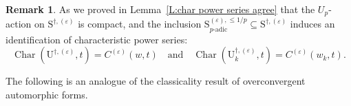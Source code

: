 \documentclass[12pt]{amsart}
\theoremstyle{definition}
\newtheorem{remark}[subsection]{Remark}
\numberwithin{equation}{subsection}
\def\rmU{\mathrm{U}}
\def\rmS{\mathrm{S}}
\DeclareMathOperator{\Char}{Char}
\begin{document}
\begin{remark}
\label{R:comparison of char power series for power basis and small basis}
As we proved in Lemma~\ref{L:char power series agree} that the $U_p$-action on $\rmS^{\dagger, (\varepsilon)}$ is compact, and the inclusion $\rmS_{p\textrm{-adic}}^{(\varepsilon), \leq 1/p} \subseteq \rmS^{\dagger, (\varepsilon)}$ induces an identification of  characteristic power series: 
\begin{equation}
\label{E:char Up of power is equal to char Up of small basis}\Char(\rmU^{\dagger,(\varepsilon)},t) = C^{(\varepsilon)}(w, t) \quad \textrm{and} \quad \Char(\rmU_k^{\dagger,(\varepsilon)}, t) = C^{(\varepsilon)}(w_k, t).
\end{equation}
\end{remark}

The following is an analogue of the classicality result of overconvergent automorphic forms.
\end{document}
